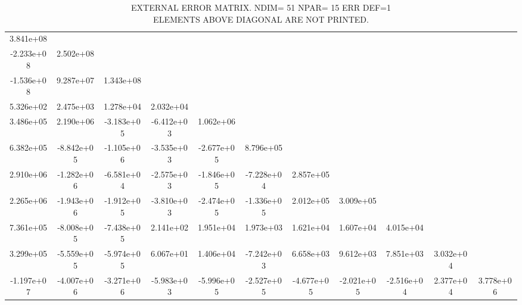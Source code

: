  \begin{sidewaystable}[!ht]
 \scriptsize
 \centering
 \begin{tabular}{c c c c c c c c c c c}
   3.841e+08 & \\
 -2.233e+08 &  2.502e+08 & \\
 -1.536e+08 &  9.287e+07 &  1.343e+08 & \\
  5.326e+02 &  2.475e+03 &  1.278e+04 &  2.032e+04 & \\
  3.486e+05 &  2.190e+06 & -3.183e+05 & -6.412e+03 &  1.062e+06 & \\
  6.382e+05 & -8.842e+05 & -1.105e+06 & -3.535e+03 & -2.677e+05 &  8.796e+05 & \\
  2.910e+06 & -1.282e+06 & -6.581e+04 & -2.575e+03 & -1.846e+05 & -7.228e+04 &  2.857e+05 & \\
  2.265e+06 & -1.943e+06 & -1.912e+05 & -3.810e+03 & -2.474e+05 & -1.336e+05 &  2.012e+05 &  3.009e+05 & \\
  7.361e+05 & -8.008e+05 & -7.438e+05 &  2.141e+02 &  1.951e+04 &  1.973e+03 &  1.621e+04 &  1.607e+04 &  4.015e+04 & \\
  3.299e+05 & -5.559e+05 & -5.974e+05 &  6.067e+01 &  1.406e+04 & -7.242e+03 &  6.658e+03 &  9.612e+03 &  7.851e+03 &  3.032e+04 & \\
 -1.197e+07 & -4.007e+06 & -3.271e+06 & -5.983e+03 & -5.996e+05 & -2.527e+05 & -4.677e+05 & -2.021e+05 & -2.516e+04 &  2.377e+04 &  3.778e+06 \\

 \end{tabular}
 \caption{EXTERNAL ERROR MATRIX. NDIM=  51    NPAR= 15    ERR DEF=1\\ ELEMENTS ABOVE DIAGONAL ARE NOT PRINTED.}
 \end{sidewaystable}
 

